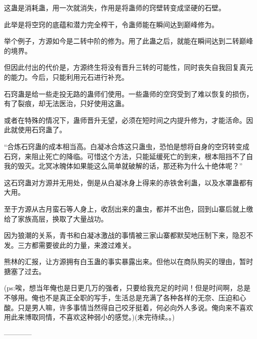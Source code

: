 \begin{this_body}
这蛊是消耗蛊，用一次就消失，作用是将蛊师的窍壁转变成坚硬的石壁。

此举是将空窍的底蕴和潜力完全榨干，令蛊师能在瞬间达到巅峰修为。

举个例子，方源如今是二转中阶的修为。用了此蛊之后，就能在瞬间达到二转巅峰的境界。

但因此付出的代价是，方源终生将没有晋升三转的可能性，同时丧失自我回复真元的能力。今后，只能利用元石进行补充。

石窍蛊是给一些走投无路的蛊师们使用。一些蛊师的空窍受到了难以恢复的损伤，有了裂痕，却无法医治，只好使用这蛊。

或者在特殊的情况下，蛊师晋升无望，必须在短时间之内提升修为，才能活命。因此就使用石窍蛊了。

“合炼石窍蛊的成本相当高。白凝冰合炼这只蛊虫，恐怕是想将自身的空窍转变成石窍，来阻止死亡的降临。可惜这个方法，只能延缓死亡的到来，根本阻挡不了自我的毁灭。北冥冰魄体如果能这么简单就破解的话，那还称为什么十绝体呢？”

这石窍蛊对方源并无用处，倒是从白凝冰身上得来的赤铁舍利蛊，以及水罩蛊都有大用。

至于方源从古月蛮石等人身上，收刮出来的蛊虫，都并不出色，回到山寨后就上缴给了家族高层，换取了大量战功。

因为狼潮的关系，青书和白凝冰激战的事情被三家山寨都默契地压制下来，隐忍不发。三方都需要彼此的力量，来渡过难关。

熊林的汇报，让方源拥有白玉蛊的事实暴露出来。但他以在商队购买的理由，暂时搪塞了过去。

(ps:唉，想当年俺也是日更几万的强者，只要给我充足的时间！但是时间啊，总是不够用。俺也不是真正全职的写手，生活总是充满了各种各样的无奈、压迫和心酸。只是男人嘛，许多事情当然得自己咬牙挺着，何必向外人多说。俺向来不喜欢用此来博取同情，不喜欢这种弱小的感觉。)(未完待续。。)

------------

\end{this_body}

